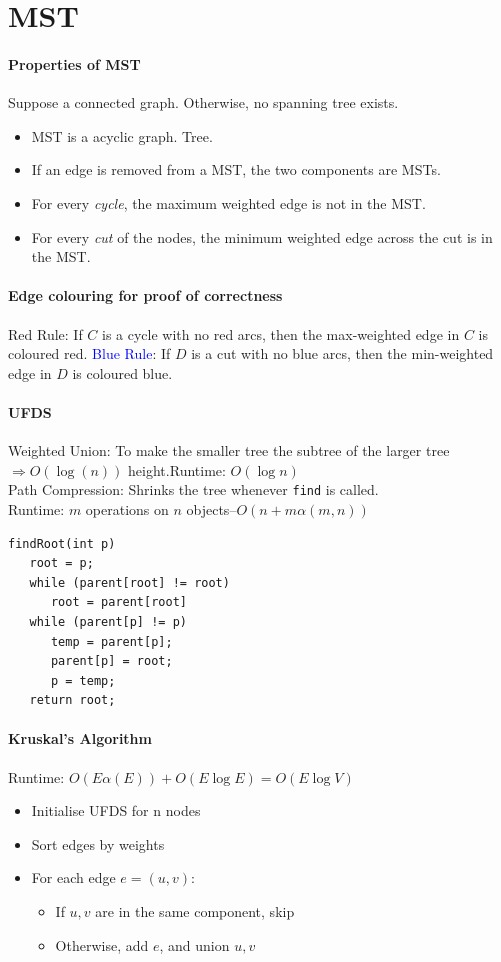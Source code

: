\section{MST}
\paragraph{Properties of MST}
Suppose a connected graph. Otherwise, no spanning tree exists.
\begin{itemize}
  \item MST is a acyclic graph. Tree.
  \item If an edge is removed from a MST, the two components are MSTs.
  \item For every \emph{cycle}, the maximum weighted edge is not in the MST.\@
  \item For every \emph{cut} of the nodes, the minimum weighted edge across the
    cut is in the MST.\@
\end{itemize}
\paragraph{Edge colouring for proof of correctness}
\textcolor{Bittersweet}{Red Rule}: If $C$ is a cycle with no red arcs, then the max-weighted edge in $C$ is coloured red.
\textcolor{Blue}{Blue Rule}: If $D$ is a cut with no blue arcs, then the min-weighted edge in $D$ is coloured blue.
\paragraph{UFDS}
Weighted Union: To make the smaller tree the subtree of the larger tree
$\Rightarrow O(\log(n))$ height.\@ \textcolor{Bittersweet}{Runtime}: $O(\log n)$\\
Path Compression: Shrinks the tree whenever \verb|find| is called.\\
\textcolor{Bittersweet}{Runtime}: $m$ operations on $n$ objects–$O(n +
m\alpha(m, n))$
\begin{verbatim}
findRoot(int p)
   root = p;
   while (parent[root] != root)
      root = parent[root]
   while (parent[p] != p)
      temp = parent[p];
      parent[p] = root;
      p = temp;
   return root;
\end{verbatim}
\paragraph{Kruskal's Algorithm}
\textcolor{Bittersweet}{Runtime}: $O(E\alpha(E)) + O(E\log E)=O(E\log V)$
\begin{itemize}
  \item Initialise UFDS for n nodes
  \item Sort edges by weights
  \item For each edge $e = (u,v)$:
    \begin{itemize}
      \item If $u,v$ are in the same component, skip
      \item Otherwise, add $e$, and union $u, v$
    \end{itemize}
\end{itemize}

